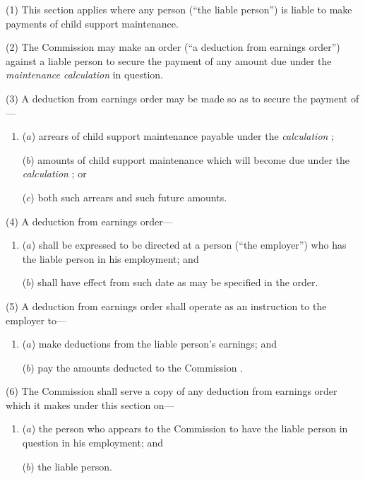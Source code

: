 \documentclass[12pt,a4paper]{article}
\begin{document}
(1) This section applies where any person (“the liable person”) is liable to make payments of child support maintenance.

(2) The 
Commission  %
may make an order (“a deduction from earnings order”) against a liable person to secure the payment of any amount due under the 
\emph{maintenance calculation}  %
in question.

(3) A deduction from earnings order may be made so as to secure the payment of—
\begin{enumerate}\item[]
($a$) arrears of child support maintenance payable under the 
\emph{calculation}%
;

($b$) amounts of child support maintenance which will become due under the 
\emph{calculation}%
; or

($c$) both such arrears and such future amounts.
\end{enumerate}

(4) A deduction from earnings order—
\begin{enumerate}\item[]
($a$) shall be expressed to be directed at a person (“the employer”) who has the liable person in his employment; and

($b$) shall have effect from such date as may be specified in the order.
\end{enumerate}

(5) A deduction from earnings order shall operate as an instruction to the employer to—
\begin{enumerate}\item[]
($a$) make deductions from the liable person’s earnings; and

($b$) pay the amounts deducted to the 
Commission%
.
\end{enumerate}

(6) The 
Commission  %
shall serve a copy of any deduction from earnings order which 
it  %
makes under this section on—
\begin{enumerate}\item[]
($a$) the person who appears to the 
Commission  %
to have the liable person in question in his employment; and

($b$) the liable person.
\end{enumerate}
\end{document}
